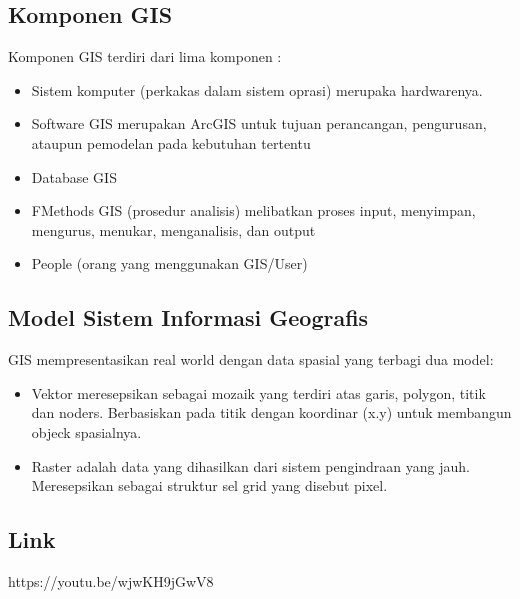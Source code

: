 \subsection{Komponen GIS}
Komponen GIS terdiri dari lima komponen :
     \begin{itemize}
	\item Sistem komputer (perkakas dalam sistem oprasi) merupaka hardwarenya.
	\item Software GIS merupakan ArcGIS untuk tujuan perancangan, pengurusan, ataupun pemodelan pada kebutuhan tertentu 
	\item Database GIS 
	\item FMethods GIS (prosedur analisis) melibatkan proses input, menyimpan, mengurus, menukar, menganalisis, dan output
	\item People (orang yang menggunakan GIS/User)
	\end{itemize}
\subsection{Model Sistem Informasi Geografis}
GIS mempresentasikan real world dengan data spasial yang terbagi dua model:
    \begin{itemize}
    \item Vektor meresepsikan sebagai mozaik yang terdiri atas garis, polygon, titik dan noders. Berbasiskan pada titik dengan koordinar (x.y) untuk membangun objeck spasialnya.
    \item Raster adalah data yang dihasilkan dari sistem pengindraan yang jauh. Meresepsikan sebagai struktur sel grid yang disebut pixel.
    \end{itemize}

\subsection{Link}
https://youtu.be/wjwKH9jGwV8

